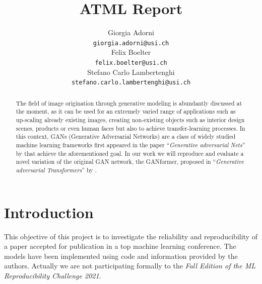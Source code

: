 \documentclass{article}
\title{ATML Report}
\author{%
		Giorgia Adorni \\
		\texttt{giorgia.adorni@usi.ch} \\
		\And
		Felix Boelter\\
		\texttt{felix.boelter@usi.ch}\\
		\And
		Stefano Carlo Lambertenghi\\
		\texttt{stefano.carlo.lambertenghi@usi.ch}\\
}
\begin{document}
	
	\maketitle
	\begin{abstract}
		The field of image origination through generative modeling is abundantly discussed at
		the moment, as it can be used for an extremely varied range of applications such as 
		up-scaling already existing images, creating non-existing objects such as interior 
		design scenes, products or even human faces but also to achieve transfer-learning 
		processes.
		In this context, GANs (Generative Adversarial Networks) are a class of widely studied 
		machine learning frameworks first appeared in the paper 
		``\emph{Generative adversarial Nets}'' by \citet{goodfellow2014generative} that achieve
		the aforementioned goal.
		In our work we will reproduce and evaluate a novel variation of the original GAN 
		network, the GANformer, proposed in  ``\emph{Generative adversarial Transformers}'' by 
		\citet{hudson2021generative}.
	\end{abstract}

	
	\section{Introduction}
	This objective of this project is to investigate the reliability and reproducibility of a paper accepted 
	for publication in a top machine learning conference.
	The models have been implemented using code and information provided by the authors.	
	Actually we are not participating formally to the \textit{Fall Edition of the ML Reproducibility 
	Challenge 2021}.
	
\end{document}
